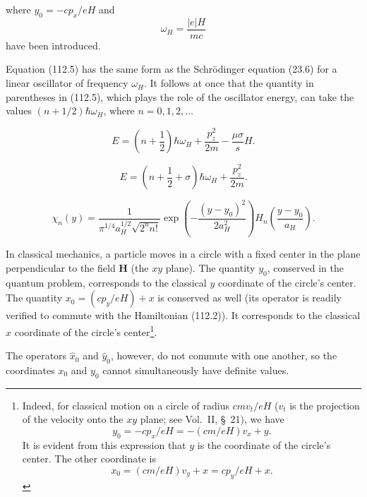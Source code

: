 where $y_0=-cp_x/eH$ and
\begin{equation}
 \omega_H=\frac{|e|H}{mc}
 \tag{112.6}
\end{equation}
have been introduced.

Equation (112.5) has the same form as the Schrödinger equation (23.6) for a linear oscillator of frequency $\omega_H$. It follows at once that the quantity in parentheses in (112.5), which plays the role of the oscillator energy, can take the values $(n+1/2)\hbar\omega_H$, where $n=0,1,2,\ldots$


\begin{equation}
 E=\left(n+\frac12\right)\hbar\omega_H+\frac{p_z^2}{2m}-\frac{\mu\sigma}{s}H.
 \tag{112.7}
\end{equation}

\begin{equation}
 E=\left(n+\frac12+\sigma\right)\hbar\omega_H+\frac{p_z^2}{2m}.
 \tag{112.8}
\end{equation}


\begin{equation}
 \chi_n(y)=\frac1{\pi^{1/4}a_H^{1/2}\sqrt{2^nn!}}\exp\left(-\frac{(y-y_0)^2}{2a_H^2}\right)H_n\left(\frac{y-y_0}{a_H}\right).
 \tag{112.9}
\end{equation}

In classical mechanics, a particle moves in a circle with a fixed center in the plane perpendicular to the field $\mathbf H$ (the $xy$ plane). The quantity $y_0$, conserved in the quantum problem, corresponds to the classical $y$ coordinate of the circle's center. The quantity $x_0=(cp_y/eH)+x$ is conserved as well (its operator is readily verified to commute with the Hamiltonian (112.2)). It corresponds to the classical $x$ coordinate of the circle's center\footnote{Indeed, for classical motion on a circle of radius $cmv_t/eH$ ($v_t$ is the projection of the velocity onto the $xy$ plane; see Vol.~II, \S~21), we have
\[
 y_0=-cp_x/eH=-(cm/eH)v_x+y.
\]
It is evident from this expression that $y$ is the coordinate of the circle's center. The other coordinate is
\[
 x_0=(cm/eH)v_y+x=cp_y/eH+x.
\]}. 

The operators $\hat x_0$ and $\hat y_0$, however, do not commute with one another, so the coordinates $x_0$ and $y_0$ cannot simultaneously have definite values.

